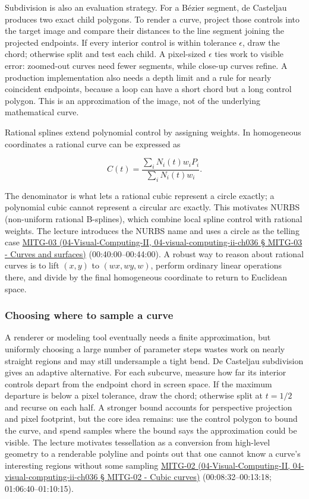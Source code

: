 Subdivision is also an evaluation strategy. For a Bézier segment, de Casteljau produces two exact child polygons. To render a curve, project those controls into the target image and compare their distances to the line segment joining the projected endpoints. If every interior control is within tolerance \(\epsilon\), draw the chord; otherwise split and test each child. A pixel-sized \(\epsilon\) ties work to visible error: zoomed-out curves need fewer segments, while close-up curves refine. A production implementation also needs a depth limit and a rule for nearly coincident endpoints, because a loop can have a short chord but a long control polygon. This is an approximation of the image, not of the underlying mathematical curve.

Rational splines extend polynomial control by assigning weights. In homogeneous coordinates a rational curve can be expressed as

\[
C(t)=\frac{\sum_i N_i(t)w_iP_i}{\sum_i N_i(t)w_i}.
\]

The denominator is what lets a rational cubic represent a circle exactly; a polynomial cubic cannot represent a circular arc exactly. This motivates NURBS (non-uniform rational B-splines), which combine local spline control with rational weights. The lecture introduces the NURBS name and uses a circle as the telling case \href{}{MITG-03 (04-Visual-Computing-II, 04-visual-computing-ii-ch036 § MITG-03 - Curves and surfaces)} (00:40:00--00:44:00). A robust way to reason about rational curves is to lift \((x,y)\) to \((wx,wy,w)\), perform ordinary linear operations there, and divide by the final homogeneous coordinate to return to Euclidean space.

\subsubsection{Choosing where to sample a curve}\label{choosing-where-to-sample-a-curve}

A renderer or modeling tool eventually needs a finite approximation, but uniformly choosing a large number of parameter steps wastes work on nearly straight regions and may still undersample a tight bend. De Casteljau subdivision gives an adaptive alternative. For each subcurve, measure how far its interior controls depart from the endpoint chord in screen space. If the maximum departure is below a pixel tolerance, draw the chord; otherwise split at \(t=1/2\) and recurse on each half. A stronger bound accounts for perspective projection and pixel footprint, but the core idea remains: use the control polygon to bound the curve, and spend samples where the bound says the approximation could be visible. The lecture motivates tessellation as a conversion from high-level geometry to a renderable polyline and points out that one cannot know a curve's interesting regions without some sampling \href{}{MITG-02 (04-Visual-Computing-II, 04-visual-computing-ii-ch036 § MITG-02 - Cubic curves)} (00:08:32--00:13:18; 01:06:40--01:10:15).

